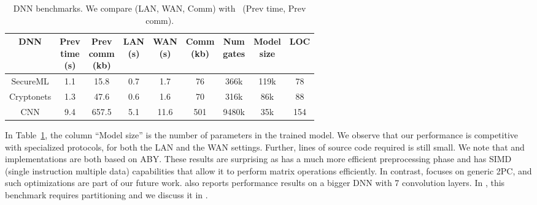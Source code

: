 \setlength\tabcolsep{2.5pt}
\begin{table}
\footnotesize
\begin{tabular}{|c|c|c|c |c|c|c|c|c|}
\hline
DNN  & \thead{Prev \\ time\\ (s)} & \thead{Prev \\ comm\\ (kb)} & \thead{LAN  \\ (s)} & \thead{WAN\\ (s)} & \thead{Comm \\(kb)} & \thead{Num \\ gates} & \thead{Model\\ size} & LOC\\
\hline
SecureML   &  1.1 & 15.8 & 0.7 & 1.7  & 76   &   366k   & 119k & 78\\
\hline
Cryptonets &  1.3 & 47.6 & 0.6 & 1.6  & 70    &  316k & 86k & 88\\
\hline
CNN        &  9.4 & 657.5& 5.1 & 11.6 & 501  & 9480k & 35k & 154\\
\hline
\end{tabular}

 \caption{DNN benchmarks. We compare \tool (LAN, WAN, Comm)
 with~\cite{minionn} (Prev time, Prev comm).}
 \label{tab:nn} 
\end{table}


In Table~\ref{tab:nn}, 
the column ``Model size'' is the number of parameters in the
trained model.
We observe that our performance is competitive with specialized
\minion protocols, for both the LAN and the WAN settings. Further, lines
of \tool source code required is still small. 
We note that \minion and \tool implementations are both based on ABY.
These results are surprising as \minion has a much more efficient
preprocessing phase and has SIMD 
(single instruction multiple data) capabilities that allow it to perform
matrix operations efficiently. In contrast, \tool focuses on generic
2PC, and such optimizations are part of our future work.
\minion also reports performance results on a bigger DNN with 7
convolution layers. In \tool, this benchmark requires partitioning and
we discuss it in .
\\\\
